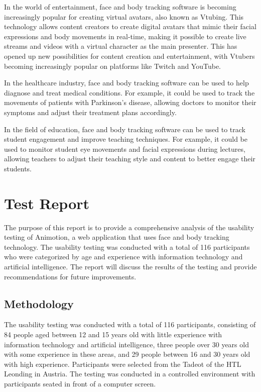 In the world of entertainment, face and body tracking software is becoming increasingly popular for creating virtual 
avatars, also known as Vtubing. This technology allows content creators to create digital avatars that mimic their 
facial expressions and body movements in real-time, making it possible to create live streams and videos with a 
virtual character as the main presenter. This has opened up new possibilities for content creation and entertainment, 
with Vtubers becoming increasingly popular on platforms like Twitch and YouTube.

In the healthcare industry, face and body tracking software can be used to help diagnose and treat medical conditions. 
For example, it could be used to track the movements of patients with Parkinson's disease, allowing doctors to monitor 
their symptoms and adjust their treatment plans accordingly.

In the field of education, face and body tracking software can be used to track student engagement and improve teaching 
techniques. For example, it could be used to monitor student eye movements and facial expressions during lectures, allowing 
teachers to adjust their teaching style and content to better engage their students.

\section{Test Report}
The purpose of this report is to provide a comprehensive analysis of the usability testing of Animotion, a web application that uses face and 
body tracking technology. The usability testing was conducted with a total of 116 participants who were categorized by age and experience 
with information technology and artificial intelligence. The report will discuss the results of the testing and provide recommendations for future improvements.

\subsection{Methodology}
The usability testing was conducted with a total of 116 participants, consisting of 84 people aged between 12 and 15 years old with little experience 
with information technology and artificial intelligence, three people over 30 years old with some experience in these areas, and 29 people 
between 16 and 30 years old with high experience. Participants were selected from the Tadeot of the HTL Leonding in Austria. 
The testing was conducted in a controlled environment with participants seated in front of a computer screen.


